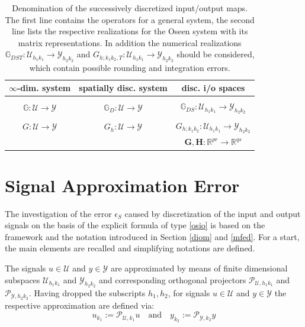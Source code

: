\documentclass[a4paper,10pt,BCOR=15mm]{scrbook}
\providecommand{\andi}[0]{\quad \text{and} \quad}
\begin{document}
\begin{table}[htbp]
\centering
\begin{tabular}{ccc}
   $\infty$-dim. system & spatially disc. system & disc. i/o spaces  \\ 
\hline \\ [-1.5ex]
$\mathbb G:\mathcal U \rightarrow \mathcal Y$& $\mathbb G_D:\mathcal U \rightarrow \mathcal Y$ &$\mathbb G_{DS}:\mathcal U_{h_1k_1} \rightarrow \mathcal Y_{h_2k_2} $ \\[.1cm]
\hline\\ [-1.5ex]
$ G:\mathcal U \rightarrow \mathcal Y$& $G_h:\mathcal U \rightarrow \mathcal Y$ &$ G_{h;k_1k_2}:\mathcal U_{h_1k_1} \rightarrow \mathcal Y_{h_2k_2} $\\ [.1cm]
&  &$\mathbf {G,H}: \mathbb R ^{pr} \rightarrow \mathbb R ^{qs} $ \\[.1cm]
\hline
\end{tabular}
\caption{Denomination of the successively discretized input/output maps. The first line contains the operators for a general system, the second line lists the respective realizations for the Oseen system with its matrix representations. In addition the numerical realizations $\mathbb G_{DST}:\mathcal U_{h_1k_1} \rightarrow \mathcal Y_{h_2k_2}$ and $G_{h;k_1k_2,T}:\mathcal U_{h_1k_1} \rightarrow \mathcal Y_{h_2k_2}$ should be considered, which contain possible rounding and integration errors.}
\label{iomaps}
\end{table}

\section{Signal Approximation Error}\label{sae}

The investigation of the error $\epsilon_S$ caused by discretization of the input and output signals on the basis of the explicit formula of type \eqref{osio} is based on the framework and the notation introduced in Section \ref{diom} and \ref{mfed}. For a start, the main elements are recalled and simplifying notations are defined.

The signals $u \in \mathcal U$ and $y \in \mathcal Y$ are approximated by means of finite dimensional subspaces  $\mathcal U _ {h_1k_1}$ and $\mathcal Y _{h_2k_2}$ and corresponding orthogonal projectors $\mathscr{P} _{\mathcal U ,h_1k_1}$ and $\mathscr{P} _{\mathcal Y ,h_2k_2}$. Having dropped the subscripts $h_1,h_2$, for signals $u \in \mathcal U$ and $y \in \mathcal Y$ the respective approximation are defined via:
\begin{equation*}
 u_{k_1} := \mathscr{P} _{\mathcal U,k_1}u \andi  y_{k_2} := \mathscr{P} _{\mathcal Y,k_2}y
\end{equation*}
\end{document}
